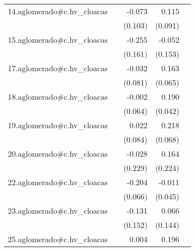 {\begin{longtable}{l*{4}{D{.}{.}{-1}}}
\addlinespace
14.aglomerado#c.hv\_cloacas&                     &      -0.073         &       0.115         &                     \\
            &                     &     (0.103)         &     (0.091)         &                     \\
\addlinespace
15.aglomerado#c.hv\_cloacas&                     &      -0.255         &      -0.052         &                     \\
            &                     &     (0.161)         &     (0.153)         &                     \\
\addlinespace
17.aglomerado#c.hv\_cloacas&                     &      -0.032         &       0.163\sym{*}  &                     \\
            &                     &     (0.081)         &     (0.065)         &                     \\
\addlinespace
18.aglomerado#c.hv\_cloacas&                     &      -0.002         &       0.190\sym{***}&                     \\
            &                     &     (0.064)         &     (0.042)         &                     \\
\addlinespace
19.aglomerado#c.hv\_cloacas&                     &       0.022         &       0.218\sym{**} &                     \\
            &                     &     (0.084)         &     (0.068)         &                     \\
\addlinespace
20.aglomerado#c.hv\_cloacas&                     &      -0.028         &       0.164         &                     \\
            &                     &     (0.229)         &     (0.224)         &                     \\
\addlinespace
22.aglomerado#c.hv\_cloacas&                     &      -0.204\sym{**} &      -0.011         &                     \\
            &                     &     (0.066)         &     (0.045)         &                     \\
\addlinespace
23.aglomerado#c.hv\_cloacas&                     &      -0.131         &       0.066         &                     \\
            &                     &     (0.152)         &     (0.144)         &                     \\
\addlinespace
25.aglomerado#c.hv\_cloacas&                     &       0.004         &       0.196\sym{**} &                     \\

\end{longtable}}
